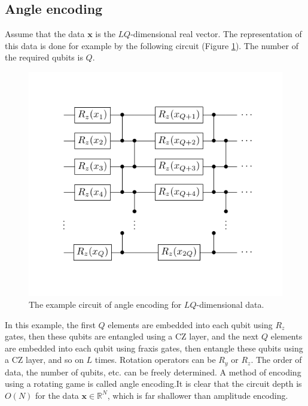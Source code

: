 \subsection{Angle encoding}
\par Assume that the data $\bm{x}$ is the $LQ$-dimensional real vector. The representation of this data is done for example by the following circuit (Figure \ref{fig:circuit5}). The number of the required qubits is $Q$. 
\begin{figure}[htb]
    \centering
    \includegraphics[keepaspectratio, scale=2]{preliminary/angle_enco.pdf}
    \caption{The example circuit of angle encoding for $LQ$-dimensional data.}
    \label{fig:circuit5}
\end{figure}

\par In this example, the first $Q$ elements are embedded into each qubit using $R_z$ gates, then these qubits are entangled using a CZ layer, and the next $Q$ elements are embedded into each qubit using fraxis gates, then entangle these qubits using a CZ layer, and so on $L$ times. Rotation operators can be $R_y$ or $R_z$. The order of data, the number of qubits, etc. can be freely determined. A method of encoding using a rotating game is called angle encoding.It is clear that the circuit depth is $O(N)$ for the data $\bm{x}\in\mathbb{R}^N$, which is far shallower than amplitude encoding.

